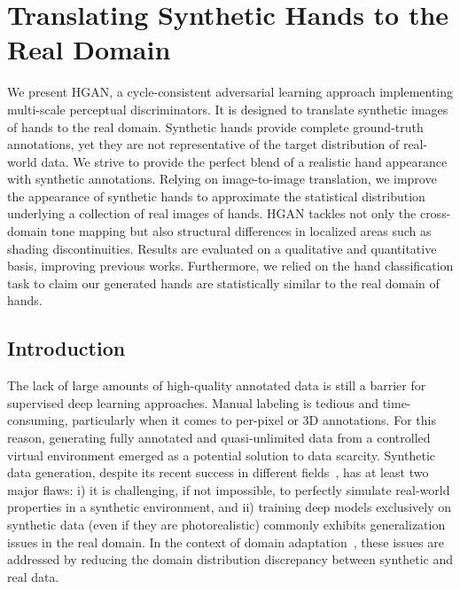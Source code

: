 \chapter{Translating Synthetic Hands to the Real Domain}
\label{cha:synthtoreal}

\begin{chapterabstract}
We present \ac{HGAN}, a cycle-consistent adversarial learning approach implementing multi-scale perceptual discriminators. It is designed to translate synthetic images of hands to the real domain. Synthetic hands provide complete ground-truth annotations, yet they are not representative of the target distribution of real-world data. We strive to provide the perfect blend of a realistic hand appearance with synthetic annotations. Relying on image-to-image translation, we improve the appearance of synthetic hands to approximate the statistical distribution underlying a collection of real images of hands. \ac{HGAN} tackles not only the cross-domain tone mapping but also structural differences in localized areas such as shading discontinuities. Results are evaluated on a qualitative and quantitative basis, improving previous works. Furthermore, we relied on the hand classification task to claim our generated hands are statistically similar to the real domain of hands.
\end{chapterabstract}

\minitoc

\clearpage

\section{Introduction}
\label{cha:synthtoreal:sec:intro}
The lack of large amounts of high-quality annotated data is still a barrier for supervised deep learning approaches. Manual labeling is tedious and time-consuming, particularly when it comes to per-pixel or 3D annotations. For this reason, generating fully annotated and quasi-unlimited data from a controlled virtual environment emerged as a potential solution to data scarcity. Synthetic data generation, despite its recent success in different fields~\cite{Nikolaus2018,Garcia2018b,Hwang2020}, has at least two major flaws: i) it is challenging, if not impossible, to perfectly simulate real-world properties in a synthetic environment, and ii) training deep models exclusively on synthetic data (even if they are photorealistic) commonly exhibits generalization issues in the real domain. In the context of domain adaptation~\cite{Zhao2020}, these issues are addressed by reducing the domain distribution discrepancy between synthetic and real data. 

